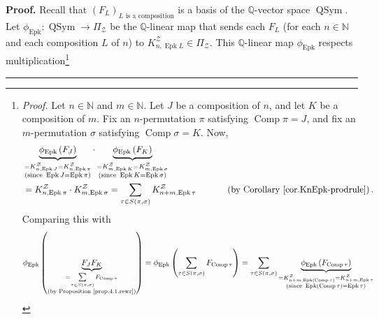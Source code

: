 \documentclass[numbers=enddot,12pt,final,onecolumn,notitlepage]{scrartcl}%
\theoremstyle{definition}
\newenvironment{proof}[1][Proof]{\noindent\textbf{#1.} }{\ \rule{0.5em}{0.5em}}
\newenvironment{verlong}{}{}
\let\sumnonlimits\sum
\renewcommand{\sum}{\sumnonlimits\limits}
\begin{document}
\begin{verlong}
\begin{proof}
Recall that $\left(  F_{L}\right)  _{L\text{ is a composition}}$ is a basis of
the $\mathbb{Q}$-vector space $\operatorname*{QSym}$. Let $\phi
_{\operatorname*{Epk}}:\operatorname*{QSym}\rightarrow\Pi_{\mathcal{Z}}$ be
the $\mathbb{Q}$-linear map that sends each $F_{L}$ (for each $n\in\mathbb{N}$
and each composition $L$ of $n$) to $K_{n,\operatorname*{Epk}L}^{\mathcal{Z}%
}\in\Pi_{\mathcal{Z}}$. This $\mathbb{Q}$-linear map $\phi
_{\operatorname*{Epk}}$ respects multiplication\footnote{\textit{Proof.} Let
$n\in\mathbb{N}$ and $m\in\mathbb{N}$. Let $J$ be a composition of $n$, and
let $K$ be a composition of $m$. Fix an $n$-permutation $\pi$ satisfying
$\operatorname*{Comp}\pi=J$, and fix an $m$-permutation $\sigma$ satisfying
$\operatorname*{Comp}\sigma=K$. Now,%
\begin{align*}
&  \underbrace{\phi_{\operatorname*{Epk}}\left(  F_{J}\right)  }%
_{\substack{=K_{n,\operatorname*{Epk}J}^{\mathcal{Z}}=K_{n,\operatorname*{Epk}%
\pi}^{\mathcal{Z}}\\\text{(since }\operatorname*{Epk}J=\operatorname*{Epk}%
\pi\text{)}}}\cdot\underbrace{\phi_{\operatorname*{Epk}}\left(  F_{K}\right)
}_{\substack{=K_{m,\operatorname*{Epk}K}^{\mathcal{Z}}%
=K_{m,\operatorname*{Epk}\sigma}^{\mathcal{Z}}\\\text{(since }%
\operatorname*{Epk}K=\operatorname*{Epk}\sigma\text{)}}}\\
&  =K_{n,\operatorname*{Epk}\pi}^{\mathcal{Z}}\cdot K_{m,\operatorname*{Epk}%
\sigma}^{\mathcal{Z}}=\sum_{\tau\in S\left(  \pi,\sigma\right)  }%
K_{n+m,\operatorname*{Epk}\tau}^{\mathcal{Z}}\ \ \ \ \ \ \ \ \ \ \left(
\text{by Corollary \ref{cor.KnEpk-prodrule}}\right)  .
\end{align*}
Comparing this with%
\begin{align*}
\phi_{\operatorname*{Epk}}\left(  \underbrace{F_{J}F_{K}}_{\substack{=\sum
_{\tau\in S\left(  \pi,\sigma\right)  }F_{\operatorname*{Comp}\tau}\\\text{(by
Proposition~\ref{prop.4.1.rewr})}}}\right)   &  =\phi_{\operatorname*{Epk}%
}\left(  \sum_{\tau\in S\left(  \pi,\sigma\right)  }F_{\operatorname*{Comp}%
\tau}\right)  =\sum_{\tau\in S\left(  \pi,\sigma\right)  }\underbrace{\phi
_{\operatorname*{Epk}}\left(  F_{\operatorname*{Comp}\tau}\right)
}_{\substack{=K_{n+m,\operatorname*{Epk}\left(  \operatorname*{Comp}%
\tau\right)  }^{\mathcal{Z}}=K_{n+m,\operatorname*{Epk}\tau}^{\mathcal{Z}%
}\\\text{(since }\operatorname*{Epk}\left(  \operatorname*{Comp}\tau\right)
=\operatorname*{Epk}\tau\text{)}}}\\

\end{align*}}
\end{proof}
\end{verlong}
\end{document}
